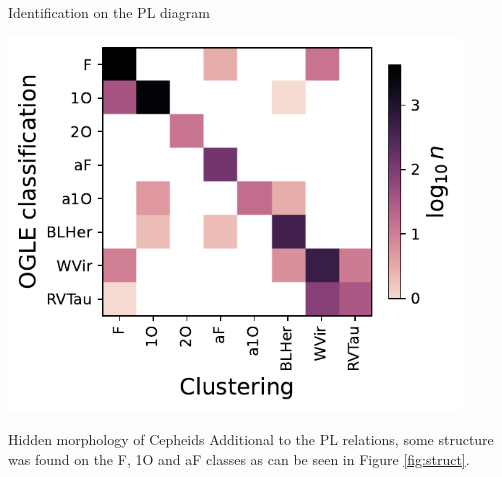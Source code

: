 \documentclass[
    a0paper,
    portrait,
]{baposter}
\begin{document}
\begin{poster}
\begin{posterbox}[name=ident,column=1,below=features,height=bottom]{Identification on the PL diagram}
    \begin{center}
    \includegraphics[width=0.9\textwidth]{fig/confusion.pdf}
    \vspace{-3mm}
    \label{fig:confusion}
    \end{center}
\end{posterbox}



\begin{posterbox}[name=struct,column=2,below=features]{Hidden morphology of Cepheids}
    Additional to the PL relations, some structure was found on the F, 1O and aF classes as can be seen in Figure \ref{fig:struct}. 


\end{posterbox}
\end{poster}
\end{document}
